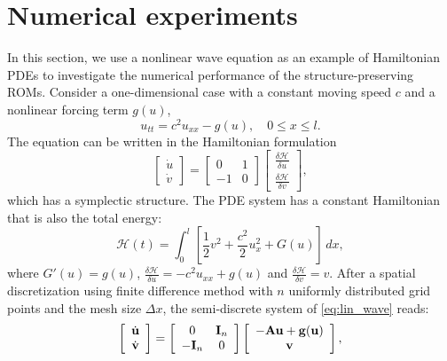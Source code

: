 \documentclass[11pt]{article}
\newcounter{example}
\begin{document}
\section{Numerical experiments\label{sec: num}}
\noindent \indent In this section, we use a nonlinear wave equation as an example of Hamiltonian PDEs to investigate the numerical performance of the structure-preserving ROMs. 
Consider a one-dimensional case with a constant moving speed $c$ and a nonlinear forcing term $g(u)$,
\begin{equation*}
u_{tt}= c^2 u_{xx} - g(u), \quad 0\leq x\leq l.
\end{equation*}
The equation can be written in the Hamiltonian formulation
\begin{equation}
\left[
\begin{array}{c}
\dot{u}\\
\dot{v}
\end{array}
\right] =
\left[
\begin{array}{cc}
0 & 1 \\
-1 & 0
\end{array}
\right]
\left[
\begin{array}{c}
\frac{\delta \mathcal{H}}{\delta u}\\
\frac{\delta \mathcal{H}}{\delta v}
\end{array}
\right],
\label{eq:lin_wave}
\end{equation}
which has a symplectic structure. The PDE system has a constant Hamiltonian that is also the total energy:  
\begin{equation*}
\mathcal{H}(t) = \int_0^l \left[\frac{1}{2}v^2+\frac{c^2}{2} u_x^2 + G(u)\right]\, dx,
\end{equation*}
where ${G}'(u) = g(u)$,
$\frac{\delta \mathcal{H}}{\delta u} = -c^2 u_{xx}+g(u)$ and $\frac{\delta \mathcal{H}}{\delta v} = v$.
After a spatial discretization using finite difference method with $n$ uniformly distributed grid points and the mesh size $\Delta x$, the semi-discrete system of \eqref{eq:lin_wave} reads: 
\begin{equation}
\left[
\begin{array}{c}
\dot{{\bf u}}\\
\dot{{\bf v}}
\end{array}
\right] =
\left[
\begin{array}{cc}
0 & {\bf I}_n \\
-{\bf I}_n & 0
\end{array}
\right]
\left[
\begin{array}{c}
-{\bf A} {\bf u}+{\bf g}({\bf u})\\
{\bf v}
\end{array}
\right],
\label{eq: wavef}
\end{equation}
\end{document}
